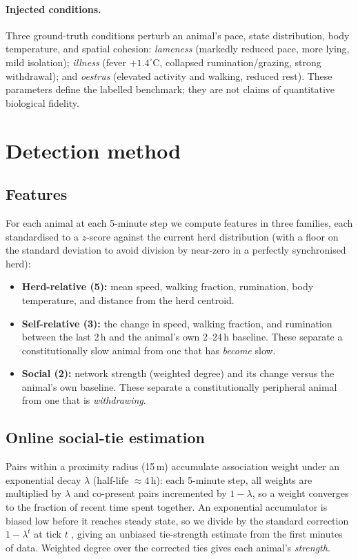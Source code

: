 \documentclass[11pt]{article}
\begin{document}
\paragraph{Injected conditions.} Three ground-truth conditions perturb an
animal's pace, state distribution, body temperature, and spatial cohesion:
\emph{lameness} (markedly reduced pace, more lying, mild isolation);
\emph{illness} (fever $+1.4^\circ$C, collapsed rumination/grazing, strong
withdrawal); and \emph{oestrus} (elevated activity and walking, reduced rest).
These parameters define the labelled benchmark; they are not claims of
quantitative biological fidelity.

\section{Detection method}
\label{sec:method}

\subsection{Features}
For each animal at each 5-minute step we compute \numfeatures{} features in three
families, each standardised to a $z$-score against the current herd distribution
(with a floor on the standard deviation to avoid division by near-zero in a
perfectly synchronised herd):
\begin{itemize}\itemsep2pt
  \item \textbf{Herd-relative (5):} mean speed, walking fraction, rumination,
  body temperature, and distance from the herd centroid.
  \item \textbf{Self-relative (3):} the change in speed, walking fraction, and
  rumination between the last 2\,h and the animal's own 2--24\,h baseline. These
  separate a constitutionally slow animal from one that has \emph{become} slow.
  \item \textbf{Social (2):} network strength (weighted degree) and its change
  versus the animal's own baseline. These separate a constitutionally peripheral
  animal from one that is \emph{withdrawing}.
\end{itemize}

\subsection{Online social-tie estimation}
Pairs within a proximity radius (15\,m) accumulate association weight under an
exponential decay $\lambda$ (half-life $\approx 4$\,h): each 5-minute step, all
weights are multiplied by $\lambda$ and co-present pairs incremented by
$1-\lambda$, so a weight converges to the fraction of recent time spent together.
An exponential accumulator is biased low before it reaches steady state, so we
divide by the standard correction $1-\lambda^{t}$ at tick $t$
\citep{kingma2015adam}, giving an unbiased tie-strength estimate from the first
minutes of data. Weighted degree over the corrected ties gives each animal's
\emph{strength}.
\end{document}
